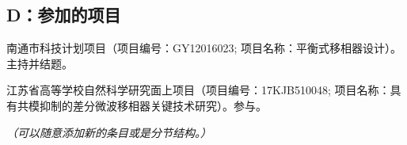 \begin{achievement}
\section*{D：参加的项目}

{
\begin{backitem}
\item 南通市科技计划项目（项目编号：GY12016023; 项目名称：平衡式移相器设计）。主持并结题。
\item 江苏省高等学校自然科学研究面上项目（项目编号：17KJB510048; 项目名称：具有共模抑制的差分微波移相器关键技术研究）。参与。
\end{backitem}
}


\emph{（可以随意添加新的条目或是分节结构。）}


\end{achievement}






